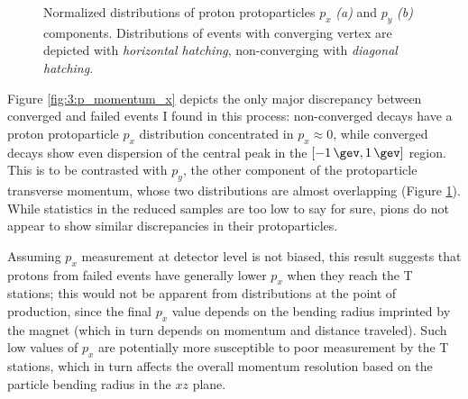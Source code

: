 \begin{figure}[t]
\begin{subfigure}{.45\textwidth}
		\caption{}
		\label{fig:3:p_momentum_y}
	\end{subfigure}
	\caption{Normalized distributions of proton protoparticles $p_x$ \textit{(a)} and $p_y$ \textit{(b)} components. Distributions of events with converging vertex are depicted with \textit{horizontal hatching}, non-converging with \textit{diagonal hatching}.}
	\label{fig:3:p_protioparticle_momenta}
\end{figure}

Figure \ref{fig:3:p_momentum_x} depicts the only major discrepancy between converged and failed events I found in this process:
non-converged \lbz decays have a proton protoparticle $p_x$ distribution concentrated in $p_x \approx 0$, while converged decays show even dispersion of the central peak in the $[-\SI{1}{\gev},\SI{1}{\gev}]$ region.
This is to be contrasted with $p_y$, the other component of the protoparticle transverse momentum, whose two distributions are almost overlapping (Figure \ref{fig:3:p_momentum_y}).
While statistics in the reduced samples are too low to say for sure, pions do not appear to show similar discrepancies in their protoparticles.

Assuming $p_x$ measurement at detector level is not biased, this result suggests that protons from failed events have generally lower $p_x$ when they reach the T stations;
this would not be apparent from \pt distributions at the point of production, since the final $p_x$ value depends on the bending radius imprinted by the magnet (which in turn depends on momentum and distance traveled).
Such low values of $p_x$ are potentially more susceptible to poor measurement by the T stations, which in turn affects the overall momentum resolution based on the particle bending radius in the $xz$ plane.

%
%
%
%
%
%
%

